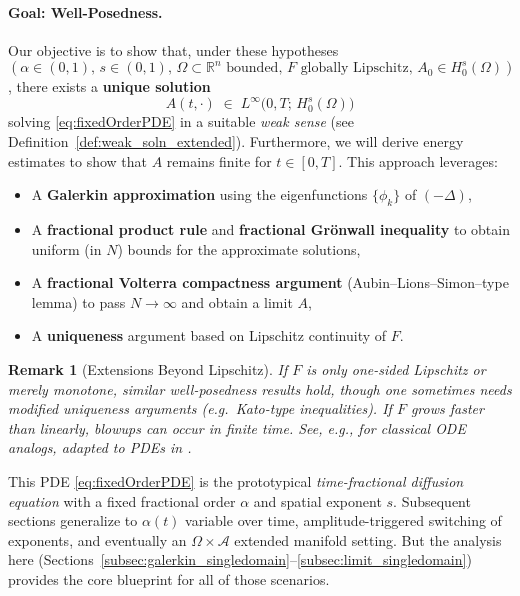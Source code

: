 \documentclass[12pt]{article}
\newtheorem{remark}[theorem]{Remark}
\begin{document}
\paragraph{Goal: Well-Posedness.}
Our objective is to show that, under these hypotheses
\((\alpha\in(0,1),\, s\in(0,1),\, \Omega \subset \mathbb{R}^n \text{ bounded},\, F \text{ globally Lipschitz},\, A_0 \in H_0^s(\Omega))\),
there exists a \textbf{unique solution}
\[
A(t,\cdot) \;\in\; L^\infty\bigl(0,T;\,H_0^s(\Omega)\bigr)
\]
solving \eqref{eq:fixedOrderPDE} in a suitable \emph{weak sense} (see
Definition~\ref{def:weak_soln_extended}).  Furthermore, we will derive energy estimates
to show that \(A\) remains finite for \(t\in[0,T]\).  This approach leverages:

\begin{itemize}
\item A \textbf{Galerkin approximation} using the eigenfunctions
  \(\{\phi_k\}\) of \((-\Delta)\),
\item A \textbf{fractional product rule} and \textbf{fractional Grönwall inequality}
  to obtain uniform (in \(N\)) bounds for the approximate solutions,
\item A \textbf{fractional Volterra compactness argument} (Aubin--Lions--Simon–type lemma)
  to pass \(N\to\infty\) and obtain a limit \(A\),
\item A \textbf{uniqueness} argument based on Lipschitz continuity of \(F\).
\end{itemize}

\begin{remark}[Extensions Beyond Lipschitz]
If \(F\) is only \emph{one-sided} Lipschitz or merely monotone, similar well-posedness
results hold, though one sometimes needs modified uniqueness arguments (e.g.\ Kato-type
inequalities).  If \(F\) grows faster than linearly, blowups can occur in finite time.
See, e.g., \cite[Ch.~7]{Diethelm2010} for classical ODE analogs, adapted to PDEs in
\cite{Zacher2005,Ye2007}.
\end{remark}

This PDE \eqref{eq:fixedOrderPDE} is the prototypical \emph{time-fractional diffusion
equation} with a fixed fractional order \(\alpha\) and spatial exponent \(s\).  
Subsequent sections generalize to \(\alpha(t)\) variable over time, amplitude-triggered
switching of exponents, and eventually an \(\Omega\times\mathcal{A}\) extended manifold
setting.  But the analysis here (Sections~\ref{subsec:galerkin_singledomain}--\ref{subsec:limit_singledomain})
provides the core blueprint for all of those scenarios.
\end{document}
